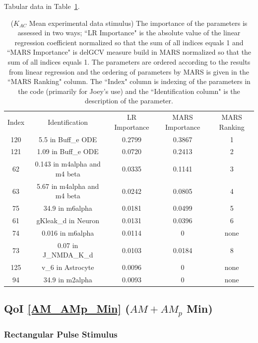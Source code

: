 \documentclass[12pt]{article}
\numberwithin{equation}{section}
\begin{document}
Tabular data in Table~\ref{qoi_K_AC_Mean_ex}.

\begin{table}[h]
\centering
\begin{tabular}{ccccc}
Index & Identification & LR Importance & MARS Importance & MARS Ranking \\
120 & 5.5 in Buff\_e ODE &  0.2799 & 0.3867 & 1\\
121 & 1.09 in Buff\_e ODE & 0.0720 & 0.2413 & 2\\
62 & 0.143 in m4alpha and m4 beta & 0.0335 & 0.1141 & 3\\
63 &   5.67 in m4alpha and m4 beta &  0.0242 & 0.0805 & 4\\
75 & 34.9 in m6alpha & 0.0181 & 0.0499 & 5\\
61 & gKleak\_d in Neuron & 0.0131 & 0.0396 & 6\\
74 & 0.016 in m6alpha & 0.0114 & 0 & none\\
73 & 0.07 in J\_NMDA\_K\_d & 0.0103 & 0.0184 & 8\\
125 & v\_6 in Astrocyte & 0.0096 & 0 & none\\
94 & 34.9 in m2alpha  & 0.0093 & 0 & none\\
\end{tabular}
\caption{($K_{AC}$ Mean experimental data stimulus) The importance of the parameters is assessed in two ways; ``LR Importance" is the absolute value of the linear regression coefficient normalized so that the sum of all indices equals 1 and ``MARS Importance" is delGCV measure build in MARS normalized so that the sum of all indices equals 1. The parameters are ordered according to the results from linear regression and the ordering of parameters by MARS is given in the ``MARS Ranking" column. The ``Index" column is indexing of the parameters in the code (primarily for Joey's use) and the ``Identification column" is the description of the parameter.}
\label{qoi_K_AC_Mean_ex}
\end{table}

\newpage
\subsection{QoI \eqref{AM_AMp_Min} ($AM+AM_p$ Min)}

\subsubsection{Rectangular Pulse Stimulus}
\end{document}

